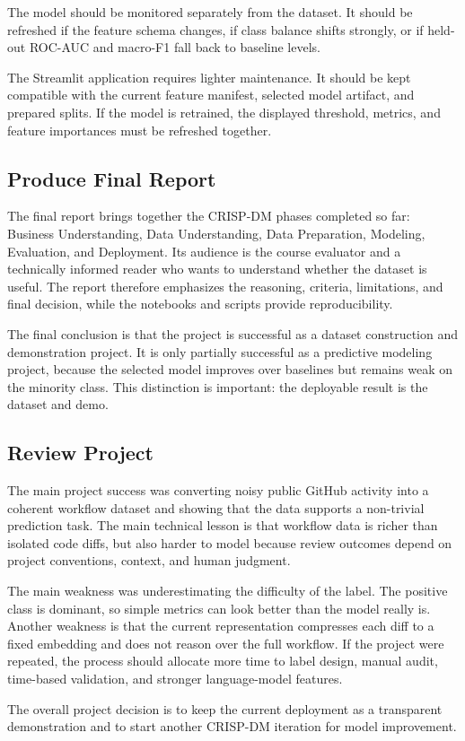 The model should be monitored separately from the dataset. It should be refreshed if the feature schema changes, if class balance shifts strongly, or if held-out ROC-AUC and macro-F1 fall back to baseline levels.

The Streamlit application requires lighter maintenance. It should be kept compatible with the current feature manifest, selected model artifact, and prepared splits. If the model is retrained, the displayed threshold, metrics, and feature importances must be refreshed together.

\subsection{Produce Final Report}

The final report brings together the CRISP-DM phases completed so far: Business Understanding, Data Understanding, Data Preparation, Modeling, Evaluation, and Deployment. Its audience is the course evaluator and a technically informed reader who wants to understand whether the dataset is useful. The report therefore emphasizes the reasoning, criteria, limitations, and final decision, while the notebooks and scripts provide reproducibility.

The final conclusion is that the project is successful as a dataset construction and demonstration project. It is only partially successful as a predictive modeling project, because the selected model improves over baselines but remains weak on the minority class. This distinction is important: the deployable result is the dataset and demo.

\subsection{Review Project}

The main project success was converting noisy public GitHub activity into a coherent workflow dataset and showing that the data supports a non-trivial prediction task. The main technical lesson is that workflow data is richer than isolated code diffs, but also harder to model because review outcomes depend on project conventions, context, and human judgment.

The main weakness was underestimating the difficulty of the label. The positive class is dominant, so simple metrics can look better than the model really is. Another weakness is that the current representation compresses each diff to a fixed embedding and does not reason over the full workflow. If the project were repeated, the process should allocate more time to label design, manual audit, time-based validation, and stronger language-model features.

The overall project decision is to keep the current deployment as a transparent demonstration and to start another CRISP-DM iteration for model improvement.
